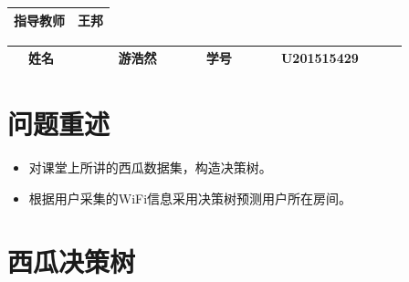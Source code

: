 \documentclass[UTF-8, a4paper, 10pt]{article}
\numberwithin{equation}{section}
\begin{document}
\begin{titlepage}
\begin{center}
\begin{table}[!hbp]
\begin{tabular}{|c|c|}
     		\hline
     		指导教师 & 王邦 \\
     		\hline
     		\end{tabular}     		
       \end{table}
       \vspace{2cm}
      \begin{table}[htbp]
      \centering
      \renewcommand\arraystretch{1.5}
     	\begin{tabular}{|c|c|c|c|}
     		\hline
            \qquad ~~姓名~~~~~  & \qquad ~~游浩然~~~~~  & \qquad 学号~~~~~ & \qquad U201515429~~~~~ \\
     		\hline
     		\end{tabular}
       \end{table}
       \date{2018年5月20日}
     \end{center}
\end{titlepage}

\section{问题重述}
\begin{itemize}
  \item 对课堂上所讲的西瓜数据集，构造决策树。
  \item 根据用户采集的WiFi信息采用决策树预测用户所在房间。
\end{itemize}

\section{西瓜决策树}
\end{document}
